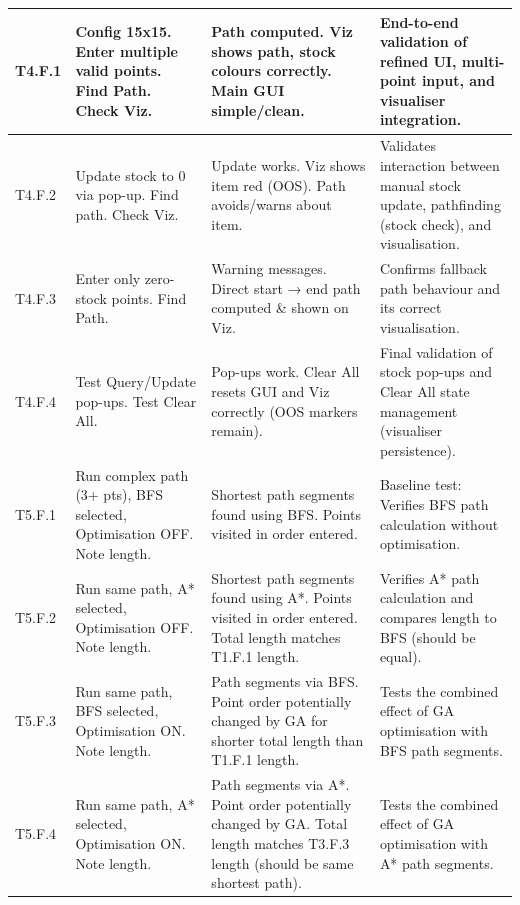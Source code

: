 \begin{longtable}{|p{}|p{}|p{}|p{}|}

T4.F.1 & Config 15x15. Enter multiple valid points. Find Path. Check Viz. & Path computed. Viz shows path, stock colours correctly. Main GUI simple/clean. & End-to-end validation of refined UI, multi-point input, and visualiser integration. \\
\hline
T4.F.2 & Update stock to 0 via pop-up. Find path. Check Viz. & Update works. Viz shows item red (OOS). Path avoids/warns about item. & Validates interaction between manual stock update, pathfinding (stock check), and visualisation. \\
\hline
T4.F.3 & Enter only zero-stock points. Find Path. & Warning messages. Direct start → end path computed \& shown on Viz. & Confirms fallback path behaviour and its correct visualisation. \\
\hline
T4.F.4 & Test Query/Update pop-ups. Test Clear All. & Pop-ups work. Clear All resets GUI and Viz correctly (OOS markers remain). & Final validation of stock pop-ups and Clear All state management (visualiser persistence). \\
\hline

T5.F.1 & Run complex path (3+ pts), BFS selected, Optimisation OFF. Note length. & Shortest path segments found using BFS. Points visited in order entered. & Baseline test: Verifies BFS path calculation without optimisation. \\
\hline
T5.F.2 & Run same path, A* selected, Optimisation OFF. Note length. & Shortest path segments found using A*. Points visited in order entered. Total length matches T1.F.1 length. & Verifies A* path calculation and compares length to BFS (should be equal). \\ %
\hline
T5.F.3 & Run same path, BFS selected, Optimisation ON. Note length. & Path segments via BFS. Point order potentially changed by GA for shorter total length than T1.F.1 length. & Tests the combined effect of GA optimisation with BFS path segments. \\ %
\hline
T5.F.4 & Run same path, A* selected, Optimisation ON. Note length. & Path segments via A*. Point order potentially changed by GA. Total length matches T3.F.3 length (should be same shortest path). & Tests the combined effect of GA optimisation with A* path segments. \\ %
\hline


\end{longtable}

